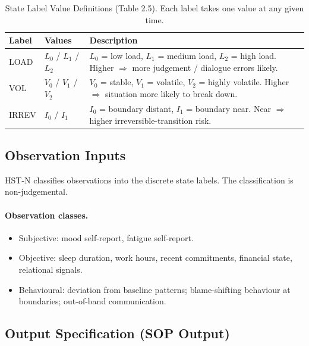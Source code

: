 \begin{table}[ht]
\centering
\small
\begin{tabularx}{\linewidth}{llX}
\toprule
\textbf{Label} & \textbf{Values} & \textbf{Description} \\
\midrule
LOAD
& $L_0$ / $L_1$ / $L_2$
& $L_0$ = low load, $L_1$ = medium load, $L_2$ = high load.
Higher $\Rightarrow$ more judgement / dialogue errors likely. \\
VOL
& $V_0$ / $V_1$ / $V_2$
& $V_0$ = stable, $V_1$ = volatile, $V_2$ = highly volatile.
Higher $\Rightarrow$ situation more likely to break down. \\
IRREV
& $I_0$ / $I_1$
& $I_0$ = boundary distant, $I_1$ = boundary near.
Near $\Rightarrow$ higher irreversible-transition risk. \\
\bottomrule
\end{tabularx}
\caption[State Label Value Definitions]{State Label Value
Definitions (Table 2.5). Each label takes one value at any given
time.}
\label{tab:hstn-state-label-values-c2}
\end{table}

\subsection{Observation Inputs}
\label{sec:hstn-observation-inputs-c2}

HST-N classifies observations into the discrete state labels. The
classification is non-judgemental.

\paragraph{Observation classes.}

\begin{itemize}
\item Subjective: mood self-report, fatigue self-report.
\item Objective: sleep duration, work hours, recent commitments,
financial state, relational signals.
\item Behavioural: deviation from baseline patterns; blame-shifting
behaviour at boundaries; out-of-band communication.
\end{itemize}

\subsection{Output Specification (SOP Output)}
\label{sec:hstn-output-spec-c2}

